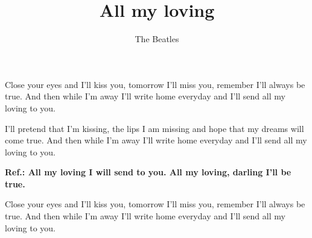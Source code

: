 \beginsong

\title{All my loving}
\author{The Beatles}

\beginverse
Close your eyes and I'll kiss you, tomorrow I'll miss you,
remember I'll always be true. 
And then while I'm away I'll write home everyday
and I'll send all my loving to you.
\endverse

\beginverse
I'll pretend that I'm kissing, the lips I am missing
and hope that my dreams will come true. 
And then while I'm away I'll write home everyday
and I'll send all my loving to you.
\endverse

\beginverse
\bf Ref.:
All my loving I will send to you.
All my loving, darling I'll be true.
\endverse

\beginverse
Close your eyes and I'll kiss you, tomorrow I'll miss you,
remember I'll always be true. 
And then while I'm away I'll write home everyday
and I'll send all my loving to you.
\endverse




